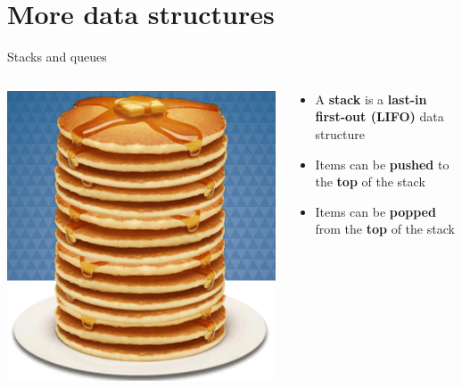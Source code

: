 \part{More data structures}
\frame{\partpage}

\begin{frame}{Stacks and queues}
	\begin{columns}
		\pause
		\begin{column}{0.3\textwidth}
			\includegraphics[width=\textwidth]{stack}
		\end{column}
		\begin{column}{0.68\textwidth}
			\begin{itemize}
				\item A \textbf{stack} is a \textbf{last-in first-out (LIFO)} data structure
				\pause\item Items can be \textbf{pushed} to the \textbf{top} of the stack
				\pause\item Items can be \textbf{popped} from the \textbf{top} of the stack
			\end{itemize}
		\end{column}
	\end{columns}
	\begin{columns}
		\pause
		\begin{column}{0.3\textwidth}

\end{column}
\end{columns}
\end{frame}

